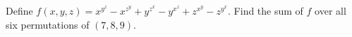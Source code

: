 Define $ f(x,y,z)=x^{y^z}-x^{z^y}+y^{z^x}-y^{x^z}+z^{x^y}-z^{y^x}$. Find the sum of $ f $ over all six permutations of $(7,8,9)$.
